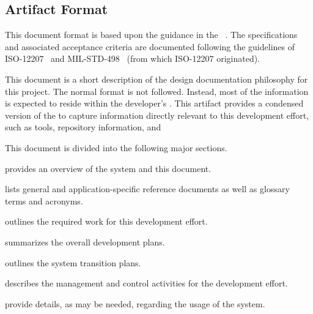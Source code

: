 
\subsection{Artifact Format}
\label{loc:DocOverview_ArtifactFormat}

This document format is based upon the guidance in the \SDP{} \DID~\cite{ref__SDP_DID}.
The specifications and associated acceptance criteria are documented following the guidelines of ISO-12207~\cite{ref__ISO_12207} and MIL-STD-498~\cite{ref__MIL_STD_498} (from which ISO-12207 originated).

This document is a short description of the design documentation philosophy for this project.
The normal \SDP format is not followed.
Instead, most of the \SDP information is expected to reside within the developer's \QMS.
This artifact provides a condensed version of the \SDP to capture information directly relevant to this development effort, such as tools, repository information, and 


This document is divided into the following major sections.
\begin{description}[itemindent=5pt,topsep=0pt,itemsep=0pt,partopsep=0pt, parsep=0pt]
	\item[Section 1] provides an overview of the system and this document.
	\item[Section 2] lists general and application-specific reference documents as well as glossary terms and acronyms. 
	\item[Section 3] outlines the required work for this development effort.
	\item[Section 4] summarizes the overall development plans.
	\item[Section 5] outlines the system transition plans.
	\item[Section 6] describes the management and control activities for the development effort.
	\item[Appendices] provide details, as may be needed, regarding the usage of the system.
\end{description}


